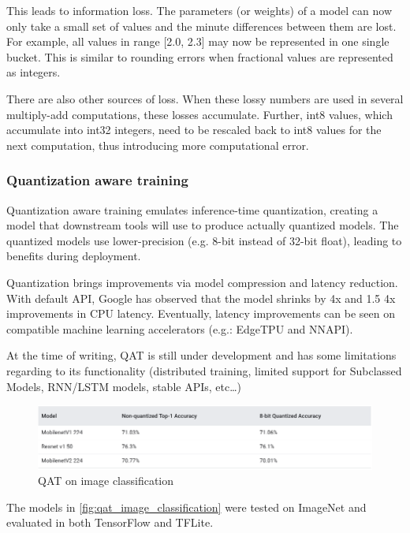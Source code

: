 This leads to information loss. The parameters (or weights) of a model can now
only take a small set of values and the minute differences between them are
lost. For example, all values in range [2.0, 2.3] may now be represented in one
single bucket. This is similar to rounding errors when fractional values are
represented as integers.

There are also other sources of loss. When these lossy numbers are used in
several multiply-add computations, these losses accumulate. Further, int8
values, which accumulate into int32 integers, need to be rescaled back to int8
values for the next computation, thus introducing more computational
error.~\cite{tfmot:quantization_blog}

\subsubsection{Quantization aware training}
Quantization aware training emulates inference-time quantization, creating a
model that downstream tools will use to produce actually quantized models. The
quantized models use lower-precision (e.g. 8-bit instead of 32-bit float),
leading to benefits during deployment.

Quantization brings improvements via model compression and latency reduction.
With default API, Google has observed that the model shrinks by 4x and 1.5 \-
4x improvements in CPU latency. Eventually, latency improvements can be seen on
compatible machine learning accelerators (e.g.: EdgeTPU and NNAPI).

At the time of writing, QAT is still under development and has some limitations
regarding to its functionality (distributed training, limited support for
Subclassed Models, RNN/LSTM models, stable APIs, etc\ldots)

\begin{figure}[ht]
    \includegraphics[width=\textwidth]{images/introduction/qat_image_classification.png}
    \centering
    \caption{QAT on image classification}\label{fig:qat_image_classification}
\end{figure}

The models in \autoref{fig:qat_image_classification} were tested on ImageNet
and evaluated in both TensorFlow and TFLite.

